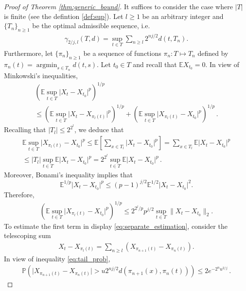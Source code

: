 \documentclass[12pt]{article}
\providecommand{\argmin}{\mathop\mathrm{arg min}}
\def\l{\left}
\def\r{\right}
\newcommand{\mb}{\mathbb}
\theoremstyle{thmstyletwo}%
\theoremstyle{thmstylethree}%
\begin{document}
\begin{proof}[Proof of Theorem \ref{thm:generic_bound}]
    It suffices to consider the case where $\lvert T \rvert$ is finite (see the defintion \eqref{def:sup}). 
    Let $l \geq 1$ be an arbitrary integer and $\{T_{n}\}_{n \geq 1}$ be the optimal admissible sequence, i.e.
    \begin{align}
    \label{eq:admissible_seq}
        \gamma_{2/j, l}(T, d) = \sup_{t \in T} \sum_{n \geq l} 2^{nj/2} d(t, T_{n}).
    \end{align}
    Furthermore, let $\{\pi_n\}_{n \geq 1}$ be a sequence of functions $\pi_n: T \mapsto T_{n}$ defined by $\pi_n(t) = \argmin_{s \in T_{n}} d(t, s)$. 
    Let $t_0\in T$ and recall that $\mb EX_{t_0} =0$. In view of Minkowski's inequalities,
    \begin{multline}
    \label{eq:separate_estimation}
        \l(\mb E \sup_{t\in T} \lvert X_t - X_{t_0}\rvert^p \r)^{1/p} 
        \\
        \leq \l(\mb E \sup_{t\in T} \lvert X_t - X_{\pi_l(t)} \rvert^p \r)^{1/p} + \l(\mb E \sup_{t\in T} \lvert X_{\pi_l(t)} - X_{t_0} \rvert^p \r)^{1/p}\,.
    \end{multline}
    Recalling that $\lvert T_{l} \rvert \leq 2^{2^l}$, we deduce that
    \begin{align*}
        \mb E \sup_{t\in T} \lvert X_{\pi_l(t)} - X_{t_0} \rvert^p \leq \mb E \l[\sum_{x \in T_{l}} \lvert X_t - X_{t_0} \rvert^p\r] = \sum_{x \in T_{l}} \mb E\lvert X_t - X_{t_0} \rvert^p \\
        \leq \lvert T_{l} \rvert \sup_{t\in T} \mb E \lvert X_t - X_{t_0} \rvert^p = 2^{2^l} \sup_{t\in T} \mb E \lvert X_t - X_{t_0} \rvert^p\,.
    \end{align*}
    Moreover, Bonami's inequality \citep[][Theorem 3.2.2]{de2012decoupling} implies that
    \[
    \mb E^{1/p} \lvert X_t - X_{t_0} \rvert^p \leq (p-1)^{j/2} \mb E^{1/2} \lvert X_t - X_{t_0} \rvert^2.
    \]
    Therefore, 
    \begin{align*}
        \l(\mb E \sup_{t\in T} \lvert X_{\pi_l(t)} - X_{t_0} \rvert^p \r)^{1/p} \leq 2^{2^l/p} p^{j/2}\sup_{t\in T}\|X_t - X_{t_0}\|_2.
    \end{align*}
    To estimate the first term in display \eqref{eq:separate_estimation}, consider the telescoping sum
    \begin{align*}
        X_t - X_{\pi_l(t)} = \sum_{n \geq l} \l(X_{\pi_{n+1}(t)} - X_{\pi_n(t)}\r).
    \end{align*}
    In view of inequality \eqref{eq:tail_prob},
    \begin{align*}
        \mb P\l(\lvert X_{\pi_{n+1}(t)} - X_{\pi_n(t)}\rvert > u2^{nj/2}d(\pi_{n+1}(x), \pi_n(t)) \r) \leq 2 e^{-2^n u^{2/j}}\,.

\end{align*}
\end{proof}
\end{document}
